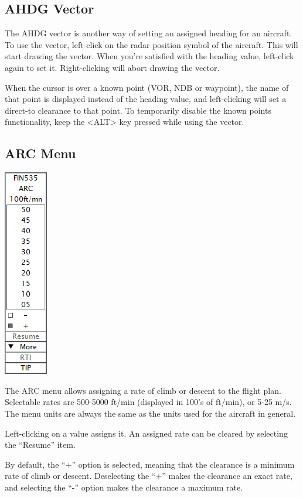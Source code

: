 \documentclass[11pt,a4paper,oldfontcommands]{memoir}
\begin{document}
\subsection{AHDG Vector}
\label{menu:ahdgv}
The AHDG vector is another way of setting an assigned heading for an aircraft. To use the vector, left-click on the radar position symbol of the aircraft. This will start drawing the vector. When you’re satisfied with the heading value, left-click again to set it. Right-clicking will abort drawing the vector.

When the cursor is over a known point (VOR, NDB or waypoint), the name of that point is displayed instead of the heading value, and left-clicking will set a direct-to clearance to that point. To temporarily disable the known points functionality, keep the <ALT> key pressed while using the vector.

\subsection{ARC Menu}
\label{menu:arc}
\includegraphics{img/arc.png}

The ARC menu allows assigning a rate of climb or descent to the flight plan. Selectable
rates are 500-5000 ft/min (displayed in 100’s of ft/min), or 5-25 m/s. The menu units are
always the same as the units used for the aircraft in general.

Left-clicking on a value assigns it. An assigned rate can be cleared by selecting the
“Resume” item.

By default, the “+” option is selected, meaning that the clearance is a minimum rate of
climb or descent. Deselecting the “+” makes the clearance an exact rate, and selecting
the “-” option makes the clearance a maximum rate.
\end{document}
